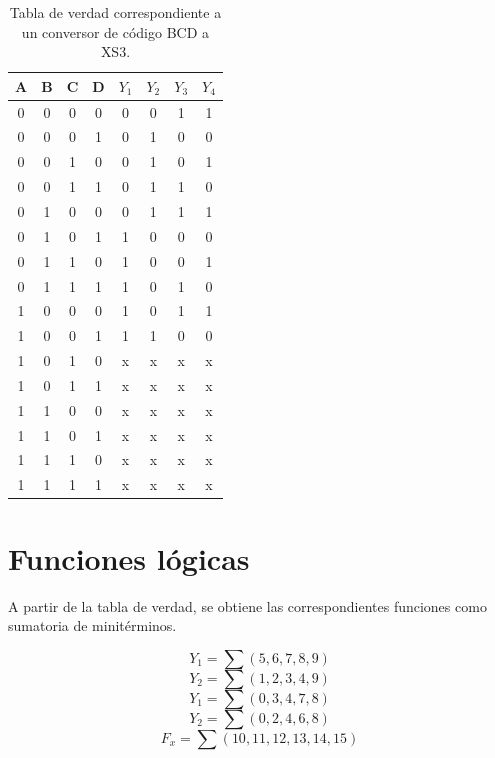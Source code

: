 \documentclass[12pt,a4paper]{report}
\begin{document}
    \begin{table}[h]
        \centering
        \begin{tabular}{cccc|cccc}
            A & B & C & D & $Y_1$ & $Y_2$ & $Y_3$ & $Y_4$ \\
            \hline
            0 & 0 & 0 & 0 & 0 & 0 & 1 & 1 \\
            0 & 0 & 0 & 1 & 0 & 1 & 0 & 0 \\
            0 & 0 & 1 & 0 & 0 & 1 & 0 & 1 \\
            0 & 0 & 1 & 1 & 0 & 1 & 1 & 0 \\
            0 & 1 & 0 & 0 & 0 & 1 & 1 & 1 \\
            0 & 1 & 0 & 1 & 1 & 0 & 0 & 0 \\
            0 & 1 & 1 & 0 & 1 & 0 & 0 & 1 \\
            0 & 1 & 1 & 1 & 1 & 0 & 1 & 0 \\
            1 & 0 & 0 & 0 & 1 & 0 & 1 & 1 \\
            1 & 0 & 0 & 1 & 1 & 1 & 0 & 0 \\
            1 & 0 & 1 & 0 & x & x & x & x \\
            1 & 0 & 1 & 1 & x & x & x & x \\
            1 & 1 & 0 & 0 & x & x & x & x \\
            1 & 1 & 0 & 1 & x & x & x & x \\
            1 & 1 & 1 & 0 & x & x & x & x \\
            1 & 1 & 1 & 1 & x & x & x & x \\
        \end{tabular}
        \caption{Tabla de verdad correspondiente a un conversor de código BCD a XS3.}
        \label{tab:example_label}
    \end{table}

    \section{Funciones lógicas}
    A partir de la tabla de verdad, se obtiene las correspondientes funciones como sumatoria de minitérminos.
    
    \begin{equation*}
        Y_1 = \sum(5,6,7,8,9)
    \end{equation*}
    \begin{equation*}
        Y_2 = \sum(1,2,3,4,9)
    \end{equation*}
    \begin{equation*}
        Y_1 = \sum(0,3,4,7,8)
    \end{equation*}
    \begin{equation*}
        Y_2 = \sum(0,2,4,6,8)
    \end{equation*}
    \begin{equation*}
        F_x = \sum(10,11,12,13,14,15)
    \end{equation*}
\end{document}
